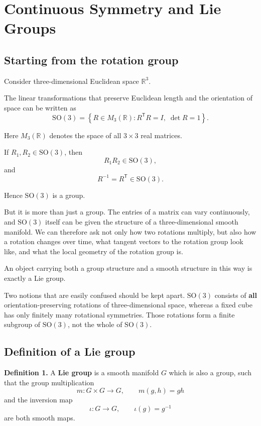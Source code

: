 \documentclass[11pt]{article}
\begin{document}
\section{Continuous Symmetry and Lie Groups}

\subsection{Starting from the rotation group}

Consider three-dimensional Euclidean space $\mathbb{R}^3$.

The linear transformations that preserve Euclidean length and the orientation of space can be written as
\[
\mathrm{SO}(3)
=
\left\{
R\in M_3(\mathbb{R})
:
R^{\mathsf T}R=I,\;
\det R=1
\right\}.
\]

Here $M_3(\mathbb{R})$ denotes the space of all $3\times 3$ real matrices.

If $R_1,R_2\in\mathrm{SO}(3)$, then
\[
R_1R_2\in\mathrm{SO}(3),
\]
and
\[
R^{-1}=R^{\mathsf T}\in\mathrm{SO}(3).
\]

Hence $\mathrm{SO}(3)$ is a group.

But it is more than just a group. The entries of a matrix can vary continuously, and $\mathrm{SO}(3)$ itself can be given the structure of a three-dimensional smooth manifold. We can therefore ask not only how two rotations multiply, but also how a rotation changes over time, what tangent vectors to the rotation group look like, and what the local geometry of the rotation group is.

An object carrying both a group structure and a smooth structure in this way is exactly a Lie group.

Two notions that are easily confused should be kept apart. $\mathrm{SO}(3)$ consists of \textbf{all} orientation-preserving rotations of three-dimensional space, whereas a fixed cube has only finitely many rotational symmetries. Those rotations form a finite subgroup of $\mathrm{SO}(3)$, not the whole of $\mathrm{SO}(3)$.


\subsection{Definition of a Lie group}

\textbf{Definition 1.}
A \textbf{Lie group} is a smooth manifold $G$ which is also a group, such that the group multiplication
\[
m:G\times G\to G,
\qquad
m(g,h)=gh
\]
and the inversion map
\[
\iota:G\to G,
\qquad
\iota(g)=g^{-1}
\]
are both smooth maps.
\end{document}
